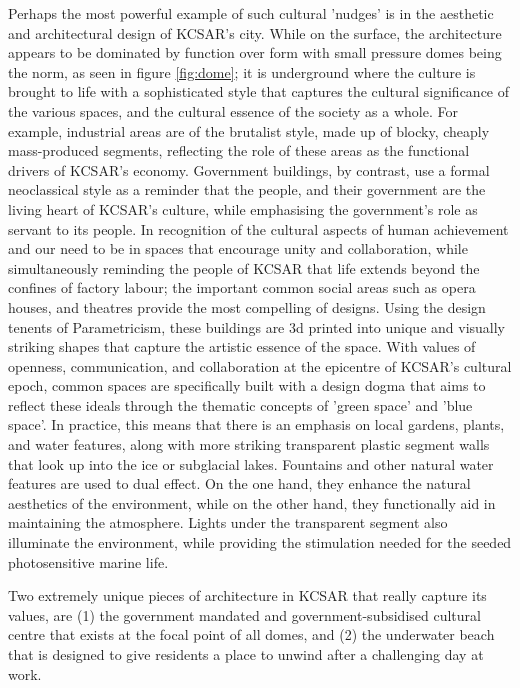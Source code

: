 \documentclass[fleqn,10pt]{Stylesheet} %
\begin{document}
Perhaps the most powerful example of such cultural 'nudges' is in the aesthetic and architectural design of KCSAR's city. While on the surface, the architecture appears to be dominated by function over form with small pressure domes being the norm, as seen in figure \ref{fig:dome}; it is underground where the culture is brought to life with a sophisticated style that captures the cultural significance of the various spaces, and the cultural essence of the society as a whole. For example, industrial areas are of the brutalist style,  made up of blocky, cheaply mass-produced segments, reflecting the role of these areas as the functional drivers of KCSAR's economy. Government buildings, by contrast, use a formal neoclassical style as a reminder that the people, and their government are the living heart of KCSAR's culture, while emphasising the government's role as servant to its people. In recognition of the cultural aspects of human achievement and our need to be in spaces that encourage unity and collaboration, while simultaneously reminding the people of KCSAR that life extends beyond the confines of factory labour; the important common social areas such as opera houses, and theatres provide the most compelling of designs. Using the design tenents of Parametricism, these buildings are 3d printed into unique and visually striking shapes that capture the artistic essence of the space. With values of openness, communication, and collaboration at the epicentre of KCSAR’s cultural epoch, common spaces are specifically built with a design dogma that aims to reflect these ideals through the thematic concepts of 'green space' and 'blue space'. In practice, this means that there is an emphasis on local gardens, plants, and water features, along with more striking transparent plastic segment walls that look up into the ice or subglacial lakes. Fountains and other natural water features are used to dual effect. On the one hand, they enhance the natural aesthetics of the environment, while on the other hand, they functionally aid in maintaining the atmosphere. Lights under the transparent segment also illuminate the environment, while providing the stimulation needed for the seeded photosensitive marine life.

Two extremely unique pieces of architecture in KCSAR that really capture its values, are (1) the government mandated and government-subsidised cultural centre that exists at the focal point of all domes, and (2) the underwater beach that is designed to give residents a place to unwind after a challenging day at work. 
\end{document}
